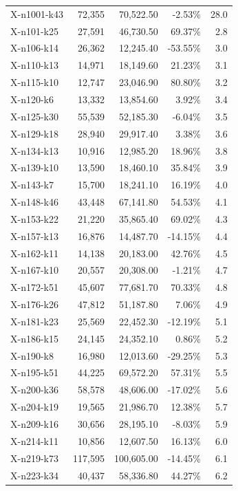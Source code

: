\documentclass[12pt,a4paper]{article}
\begin{document}
\begin{longtable}{@{}lrrrr@{}}
    X-n1001-k43 & 72,355 & 70,522.50 & -2.53\% & 28.0 \\
    X-n101-k25 & 27,591 & 46,730.50 & 69.37\% & 2.8 \\
    X-n106-k14 & 26,362 & 12,245.40 & -53.55\% & 3.0 \\
    X-n110-k13 & 14,971 & 18,149.60 & 21.23\% & 3.1 \\
    X-n115-k10 & 12,747 & 23,046.90 & 80.80\% & 3.2 \\
    X-n120-k6 & 13,332 & 13,854.60 & 3.92\% & 3.4 \\
    X-n125-k30 & 55,539 & 52,185.30 & -6.04\% & 3.5 \\
    X-n129-k18 & 28,940 & 29,917.40 & 3.38\% & 3.6 \\
    X-n134-k13 & 10,916 & 12,985.20 & 18.96\% & 3.8 \\
    X-n139-k10 & 13,590 & 18,460.10 & 35.84\% & 3.9 \\
    X-n143-k7 & 15,700 & 18,241.10 & 16.19\% & 4.0 \\
    X-n148-k46 & 43,448 & 67,141.80 & 54.53\% & 4.1 \\
    X-n153-k22 & 21,220 & 35,865.40 & 69.02\% & 4.3 \\
    X-n157-k13 & 16,876 & 14,487.70 & -14.15\% & 4.4 \\
    X-n162-k11 & 14,138 & 20,183.00 & 42.76\% & 4.5 \\
    X-n167-k10 & 20,557 & 20,308.00 & -1.21\% & 4.7 \\
    X-n172-k51 & 45,607 & 77,681.70 & 70.33\% & 4.8 \\
    X-n176-k26 & 47,812 & 51,187.80 & 7.06\% & 4.9 \\
    X-n181-k23 & 25,569 & 22,452.30 & -12.19\% & 5.1 \\
    X-n186-k15 & 24,145 & 24,352.10 & 0.86\% & 5.2 \\
    X-n190-k8 & 16,980 & 12,013.60 & -29.25\% & 5.3 \\
    X-n195-k51 & 44,225 & 69,572.20 & 57.31\% & 5.5 \\
    X-n200-k36 & 58,578 & 48,606.00 & -17.02\% & 5.6 \\
    X-n204-k19 & 19,565 & 21,986.70 & 12.38\% & 5.7 \\
    X-n209-k16 & 30,656 & 28,195.10 & -8.03\% & 5.9 \\
    X-n214-k11 & 10,856 & 12,607.50 & 16.13\% & 6.0 \\
    X-n219-k73 & 117,595 & 100,605.00 & -14.45\% & 6.1 \\
    X-n223-k34 & 40,437 & 58,336.80 & 44.27\% & 6.2 \\

\end{longtable}
\end{document}
